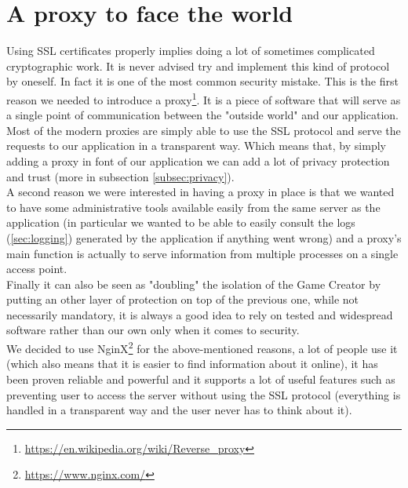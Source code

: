 \section{A proxy to face the world}\label{sec:proxy}
Using SSL certificates properly implies doing a lot of sometimes complicated cryptographic work. It is never advised try and implement this kind of protocol by oneself. In fact it is one of the most common security mistake. This is the first reason we needed to introduce a proxy\footnote{\url{https://en.wikipedia.org/wiki/Reverse_proxy}}. It is a piece of software that will serve as a single point of communication between the "outside world" and our application. Most of the modern proxies are simply able to use the SSL protocol and serve the requests to our application in a transparent way. Which means that, by simply adding a proxy in font of our application we can add a lot of privacy protection and trust (more in subsection \ref{subsec:privacy}).\\
A second reason we were interested in having a proxy in place is that we wanted to have some administrative tools available easily from the same server as the application (in particular we wanted to be able to easily consult the logs (\ref{sec:logging}) generated by the application if anything went wrong) and a proxy's main function is actually to serve information from multiple processes on a single access point.\\
Finally it can also be seen as "doubling" the isolation of the Game Creator by putting an other layer of protection on top of the previous one, while not necessarily mandatory, it is always a good idea to rely on tested and widespread software rather than our own only when it comes to security.\\
We decided to use NginX\footnote{\url{https://www.nginx.com/}} for the above-mentioned reasons, a lot of people use it (which also means that it is easier to find information about it online), it has been proven reliable and powerful and it supports a lot of useful features such as preventing user to access the server without using the SSL protocol (everything is handled in a transparent way and the user never has to think about it).
